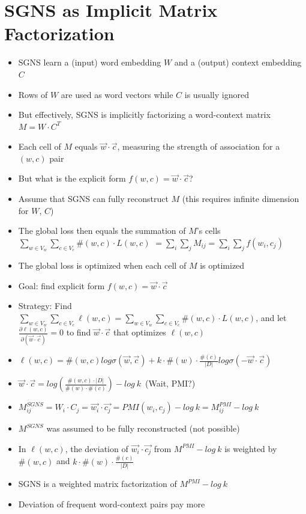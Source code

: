 \documentclass[compress]{beamer}
\begin{document}
\section[SGNS Factorization]{SGNS as Implicit Matrix Factorization}
\begin{frame}[allowframebreaks]{\secname}
	\begin{itemize}
      \item SGNS learn a (input) word embedding $W$ and a (output) context embedding $C$
      \item Rows of $W$ are used as word vectors while $C$ is usually ignored
      \item But effectively,  SGNS is implicitly factorizing a word-context matrix $M=W\cdot C^T$
      \item Each cell of $M$ equals $\vec{w}\cdot \vec{c}$, measuring the strength of association for a $(w,c)$ pair
      \item But what is the explicit form  $f(w,c)=\vec{w}\cdot \vec{c}$? 
    \end{itemize}
    \framebreak
    \begin{itemize}
      \item Assume that SGNS can fully reconstruct $M$ (this requires infinite dimension for $W$, $C$)
      \item The global loss  then equals the summation of $M$'s cells \\ $\sum\limits_{w\in V_w}\sum\limits_{c \in V_c}\#(w,c)\cdot L(w,c)$ $=\sum_i\sum_j M_{ij}=\sum_i\sum_j f(w_i,c_j)$
      \item The global loss is optimized when each cell of $M$ is optimized
      \item Goal: find explicit form $f(w,c)=\vec{w}\cdot \vec{c}$
      \item Strategy: Find $\sum\limits_{w \in V_w}\sum\limits_{c \in V_c}\ell(w,c)=\sum\limits_{w\in V_w}\sum\limits_{c \in V_c}\#(w,c)\cdot L(w,c)$, and let $\frac{\partial \ell(w,c)}{\partial (\vec{w}\cdot \vec{c})}=0$ to find $\vec{w}\cdot \vec{c}$ that optimizes $\ell(w,c)$
	\end{itemize}
     \framebreak
    \begin{itemize}
      \item  $\ell(w,c)=\#(w,c)log\sigma(\vec{w},\vec{c})+k\cdot\#(w)\cdot\frac{\#(c)}{|D|}log\sigma(-\vec{w}\cdot \vec{c})$
      \item $\vec{w}\cdot \vec{c}=log\left( \frac{\#(w,c)\cdot |D|}{\#(w)\cdot\#(c)}\right) - log~k$~(Wait, PMI?)
      \item $M^{SGNS}_{ij}=W_i\cdot C_j=\vec{w_i}\cdot \vec{c_j}=PMI(w_i, c_j)-log~k=M_{ij}^{PMI}-log~k$
      \item  $M^{SGNS}$ was assumed to be fully reconstructed (not possible)
      \item In $\ell(w,c)$, the deviation of $\vec{w_i}\cdot\vec{c_j}$ from $M^{PMI}-log~k$ is weighted by $\#(w,c)$ and $k\cdot\#(w)\cdot\frac{\#(c)}{|D|}$
      \item SGNS is a weighted matrix factorization of $M^{PMI}-log~k$
      \item Deviation of frequent word-context pairs pay more
	\end{itemize}
\end{frame}
\end{document}
